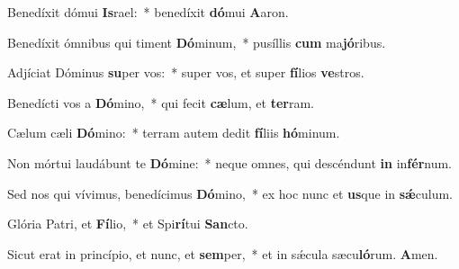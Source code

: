 \item Benedíxit dómui \textbf{Is}rael:~* benedíxit \textbf{dó}mui \textbf{A}aron.
\item Benedíxit ómnibus qui timent \textbf{Dó}minum,~* pusíllis \textbf{cum} ma\textbf{jó}ribus.
\item Adjíciat Dóminus \textbf{su}per vos:~* super vos, et super \textbf{fí}lios \textbf{ve}stros.
\item Benedícti vos a \textbf{Dó}mino,~* qui fecit \textbf{cæ}lum, et \textbf{ter}ram.
\item Cælum cæli \textbf{Dó}mino:~* terram autem dedit \textbf{fí}liis \textbf{hó}minum.
\item Non mórtui laudábunt te \textbf{Dó}mine:~* neque omnes, qui descéndunt \textbf{in} in\textbf{fér}num.
\item Sed nos qui vívimus, benedícimus \textbf{Dó}mino,~* ex hoc nunc et \textbf{us}que in \textbf{sǽ}culum.
\item Glória Patri, et \textbf{Fí}lio,~* et Spi\textbf{rí}tui \textbf{San}cto.
\item Sicut erat in princípio, et nunc, et \textbf{sem}per,~* et in sǽcula sæcu\textbf{ló}rum. \textbf{A}men.
